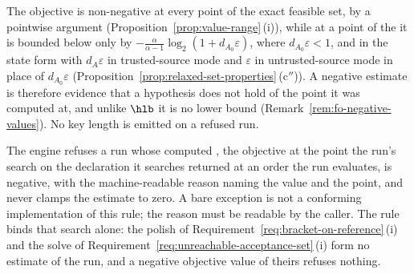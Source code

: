 
The objective is non-negative at every point of the exact feasible set, by a
pointwise argument (Proposition~\ref{prop:value-range}\,(i)), while at a
point of the  it is bounded below only by
$-\frac{\alpha}{\alpha-1}\log_2(1+d_{A_0}\varepsilon)$, where
$d_{A_0}\varepsilon<1$, and in the state form with $d_A\varepsilon$ in
trusted-source mode and $\varepsilon$ in untrusted-source mode in place of
$d_{A_0}\varepsilon$
(Proposition~\ref{prop:relaxed-set-properties}\,(c$''$)). A negative estimate
is therefore evidence that a hypothesis does not hold of the point it was
computed at, and unlike $\hlb$ it is no lower bound
(Remark~\ref{rem:fo-negative-values}). No key length is emitted on a refused
run.

\begin{requirement}\label{req:negative-estimate-refused}
The engine refuses a run whose computed , the objective at
the point the run's search on the declaration it searches returned at an
order the run evaluates, is negative, with the
machine-readable reason  naming the value and the
point, and never clamps the estimate to zero. A bare exception is not a
conforming implementation of this rule; the reason must be readable by the
caller. The rule binds that search alone: the polish of
Requirement~\ref{req:bracket-on-reference}\,(i) and the solve of
Requirement~\ref{req:unreachable-acceptance-set}\,(i) form no estimate of
the run, and a negative objective value of theirs refuses nothing.
\end{requirement}
